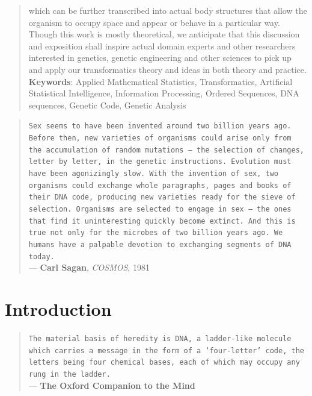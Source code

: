 \documentclass[a4paper, 18pt]{article} %
\begin{document}
\begin{abstract}
which can be further transcribed into actual body structures that allow the organism to occupy space and appear or behave in a particular way. Though this work is mostly theoretical, we anticipate that this discussion and exposition shall inspire actual domain experts and other researchers interested in genetics, genetic engineering and other sciences to pick up and apply our transformatics theory and ideas in both theory and practice.
     \newline\newline
     \textbf{Keywords}: Applied Mathematical Statistics, Transformatics, Artificial Statistical Intelligence, Information Processing, Ordered Sequences, DNA sequences, Genetic Code, Genetic Analysis
\end{abstract}

\begin{quotation}
\noindent \texttt{Sex seems to have been invented around two billion years ago. Before then, new varieties of organisms could arise only from the accumulation of random mutations --- the selection of changes, letter by letter, in the genetic instructions. Evolution must have been agonizingly slow. With the invention of sex, two organisms could exchange whole paragraphs, pages and books of their DNA code, producing new varieties ready for the sieve of selection. Organisms are selected to engage in sex --- the ones that find it uninteresting quickly become extinct. And this is true not only for the microbes of two billion years ago. We humans have a palpable devotion to exchanging segments of DNA today.}\\
\hspace*{\fill} --- \textbf{Carl Sagan}, \textit{COSMOS}, 1981\cite{sagan1981cosmos}
\end{quotation}



\section{Introduction}
\label{SEC1}


\begin{quotation}
\noindent \texttt{The material basis of heredity is DNA, a ladder-like molecule which carries a message in the form of a `four-letter' code, the letters being four chemical bases, each of which may occupy any rung in the ladder.}\\
\hspace*{\fill} --- \textbf{The Oxford Companion to the Mind}\cite{gregory1987oxford}
\end{quotation}
\end{document}
